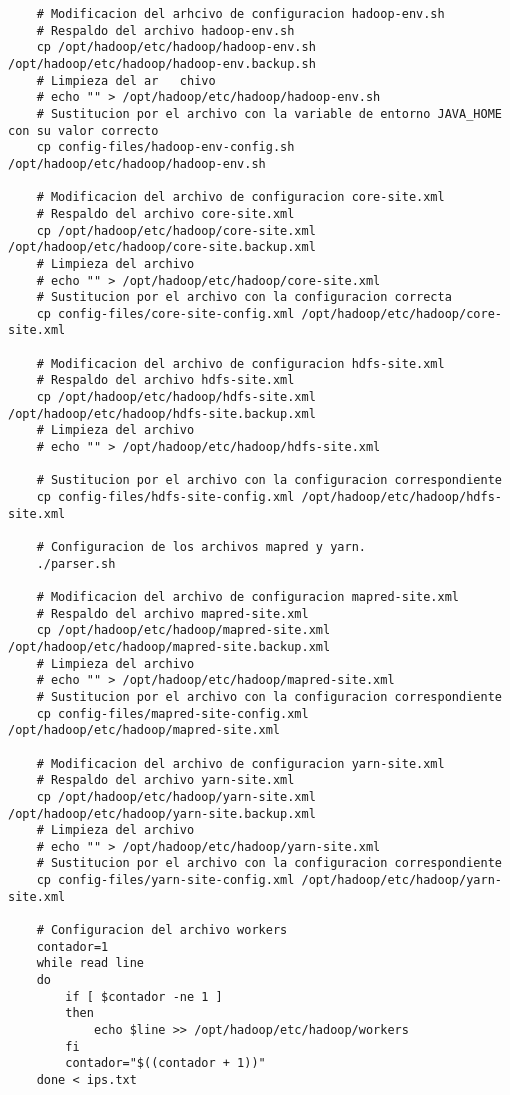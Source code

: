 \begin{lstlisting}
	# Modificacion del arhcivo de configuracion hadoop-env.sh
	# Respaldo del archivo hadoop-env.sh
	cp /opt/hadoop/etc/hadoop/hadoop-env.sh /opt/hadoop/etc/hadoop/hadoop-env.backup.sh 
	# Limpieza del ar 	chivo
	# echo "" > /opt/hadoop/etc/hadoop/hadoop-env.sh
	# Sustitucion por el archivo con la variable de entorno JAVA_HOME con su valor correcto
	cp config-files/hadoop-env-config.sh /opt/hadoop/etc/hadoop/hadoop-env.sh

	# Modificacion del archivo de configuracion core-site.xml
	# Respaldo del archivo core-site.xml
	cp /opt/hadoop/etc/hadoop/core-site.xml /opt/hadoop/etc/hadoop/core-site.backup.xml
	# Limpieza del archivo 
	# echo "" > /opt/hadoop/etc/hadoop/core-site.xml
	# Sustitucion por el archivo con la configuracion correcta
	cp config-files/core-site-config.xml /opt/hadoop/etc/hadoop/core-site.xml

	# Modificacion del archivo de configuracion hdfs-site.xml
	# Respaldo del archivo hdfs-site.xml
	cp /opt/hadoop/etc/hadoop/hdfs-site.xml /opt/hadoop/etc/hadoop/hdfs-site.backup.xml
	# Limpieza del archivo
	# echo "" > /opt/hadoop/etc/hadoop/hdfs-site.xml

	# Sustitucion por el archivo con la configuracion correspondiente
	cp config-files/hdfs-site-config.xml /opt/hadoop/etc/hadoop/hdfs-site.xml

	# Configuracion de los archivos mapred y yarn.
	./parser.sh

	# Modificacion del archivo de configuracion mapred-site.xml
	# Respaldo del archivo mapred-site.xml
	cp /opt/hadoop/etc/hadoop/mapred-site.xml /opt/hadoop/etc/hadoop/mapred-site.backup.xml
	# Limpieza del archivo
	# echo "" > /opt/hadoop/etc/hadoop/mapred-site.xml
	# Sustitucion por el archivo con la configuracion correspondiente
	cp config-files/mapred-site-config.xml /opt/hadoop/etc/hadoop/mapred-site.xml

	# Modificacion del archivo de configuracion yarn-site.xml
	# Respaldo del archivo yarn-site.xml
	cp /opt/hadoop/etc/hadoop/yarn-site.xml /opt/hadoop/etc/hadoop/yarn-site.backup.xml
	# Limpieza del archivo
	# echo "" > /opt/hadoop/etc/hadoop/yarn-site.xml
	# Sustitucion por el archivo con la configuracion correspondiente
	cp config-files/yarn-site-config.xml /opt/hadoop/etc/hadoop/yarn-site.xml

	# Configuracion del archivo workers
	contador=1
	while read line
	do
		if [ $contador -ne 1 ]
		then
			echo $line >> /opt/hadoop/etc/hadoop/workers
		fi
		contador="$((contador + 1))"
	done < ips.txt


\end{lstlisting}
